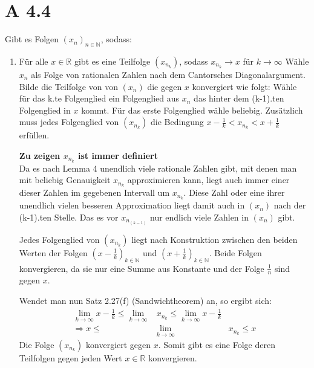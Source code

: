 \documentclass{article}
\begin{document}
    \section*{A 4.4}
        Gibt es Folgen \( {(x_n)}_{n \in \mathbb{N}} \), sodass:
        \begin{enumerate}[ label = (\roman*)]
            \item Für alle \( x \in \mathbb{R} \) gibt es eine Teilfolge \( (x_{n_k}) \), sodass \(x_{n_k} \to x\) für \( k \to \infty \)
            Wähle \(x_n\) als Folge von rationalen Zahlen nach dem Cantorsches Diagonalargument.
            Bilde die Teilfolge von von \((x_n)\) die gegen \(x\) konvergiert wie folgt:
            Wähle für das k.te Folgenglied ein Folgenglied aus \(x_n\) das hinter dem (k-1).ten Folgenglied in \(x\) kommt.
            Für das erste Folgenglied wähle beliebig.
            Zusätzlich muss jedes Folgenglied von \( (x_{n_k}) \) die Bedingung \( x - \frac{1}{k} < x_{n_k} < x + \frac{1}{k} \) erfüllen.

            \textbf{Zu zeigen \(x_{n_k}\) ist immer definiert} \\
            Da es nach Lemma 4 unendlich viele rationale Zahlen gibt, mit denen man mit beliebig Genauigkeit \( x_{n_k} \) approximieren kann,
            liegt auch immer einer dieser Zahlen im gegebenen Intervall um \( x_{n_k} \). Diese Zahl oder eine ihrer unendlich vielen
            besseren Approximation liegt damit auch in \( (x_n) \) nach der (k-1).ten Stelle. Das es vor \(x_{n_{(k-1)}}\) nur endlich viele Zahlen in \( (x_n) \) gibt.

            Jedes Folgenglied von \((x_{n_k})\) liegt nach Konstruktion zwischen den beiden Werten der Folgen
            \( {(x - \frac{1}{k}) }_{k \in \mathbb{N}}\) und \( { (x + \frac{1}{k}) }_{k \in \mathbb{N}} \).
            Beide Folgen konvergieren, da sie nur eine Summe aus Konstante und der Folge \(\frac{1}{n}\) sind gegen \(x\).

            Wendet man nun Satz 2.27(f) (Sandwichtheorem) an, so ergibt sich:
            \begin{align*}
                \lim_{k \to \infty} x - \frac{1}{k} \leq \lim_{k \to \infty} &x_{n_k} \leq \lim_{k \to \infty} x - \frac{1}{k} \\
                \Rightarrow x \leq &\lim_{k \to \infty} &x_{n_k} \leq x
            \end{align*}
            Die Folge \((x_{n_k})\) konvergiert gegen \(x\).
            Somit gibt es eine Folge deren Teilfolgen gegen jeden Wert \( x \in \mathbb{R} \) konvergieren.
            

\end{enumerate}
\end{document}
